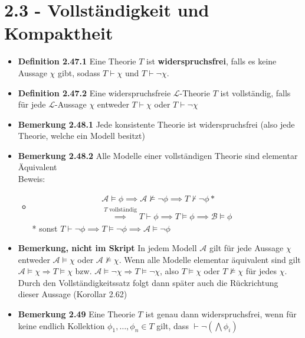 \documentclass{scrartcl}
\renewcommand{\models}[0]{\vDash}
\begin{document}
\section*{2.3 - Vollständigkeit und Kompaktheit}
\begin{itemize}
    \item \textbf{Definition 2.47.1} Eine Theorie $T$ ist \textbf{widerspruchsfrei}, falls es keine Aussage $\chi$ gibt, sodass $T \vdash \chi$ und $T \vdash \neg \chi$.
    \item \textbf{Definition 2.47.2} Eine widerspruchsfreie $\mathcal{L}$-Theorie $T$ ist vollständig, falls für jede $\mathcal{L}$-Aussage $\chi$ entweder $T \vdash \chi$ oder $T \vdash \neg \chi$
    \item \textbf{Bemerkung 2.48.1} Jede konsistente Theorie ist widerspruchsfrei (also jede Theorie, welche ein Modell besitzt)
    \item \textbf{Bemerkung 2.48.2} Alle Modelle einer vollständigen Theorie sind elementar Äquivalent\\
    Beweis:
    \begin{itemize}
        \item 
        \begin{align*}
                     \mathcal{A} \vDash \phi
            \implies \mathcal{A} \nvDash \neg \phi
            \implies T \nvdash \neg \phi*\\
            \overset{\text{$T$ vollständig}}{\implies} T \vdash \phi
            \implies T \vDash \phi
            \implies \mathcal{B} \vDash \phi 
        \end{align*}
        * sonst $T \vdash \neg \phi \implies T \vDash \neg \phi \implies \mathcal{A} \vDash \neg \phi$
    \end{itemize}
    \item \textbf{Bemerkung, nicht im Skript}
        In jedem Modell $\mathcal{A}$ gilt für jede Aussage $\chi$ entweder $\mathcal{A} \models \chi$ oder $\mathcal{A} \nvDash \chi$. Wenn alle Modelle elementar äquivalent sind gilt $\mathcal{A} \models \chi \Rightarrow T \models \chi$ bzw. $\mathcal{A} \models \neg\chi \Rightarrow T \models \neg \chi$, also $T \models \chi$ oder $T \nvDash \chi$ für jedes $\chi$. Durch den Vollständigkeitssatz folgt dann später auch die Rückrichtung dieser Aussage (Korollar 2.62)
    \item \textbf{Bemerkung 2.49} Eine Theorie $T$ ist genau dann widerspruchsfrei, wenn für keine endlich Kollektion $\phi_1, \hdots, \phi_n \in T$ gilt, dass $\vdash \neg(\bigwedge \phi_i)$ 

\end{itemize}
\end{document}

